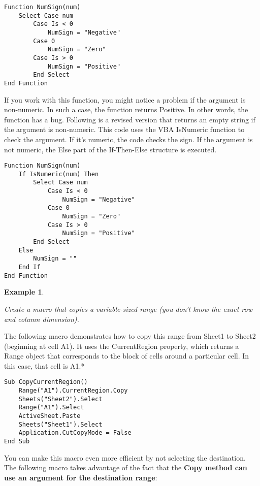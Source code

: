 \documentclass[
]{article}
\theoremstyle{definition}
\theoremstyle{definition}
\newtheorem{example}{Example}[section]
\theoremstyle{definition}
\theoremstyle{definition}
\theoremstyle{remark}
\begin{document}
\begin{verbatim}
Function NumSign(num)
    Select Case num
        Case Is < 0
            NumSign = "Negative"
        Case 0
            NumSign = "Zero"
        Case Is > 0
            NumSign = "Positive"
        End Select
End Function
\end{verbatim}

If you work with this function, you might notice a problem if the argument is non-numeric. In such a case, the function returns Positive. In other words, the function has a bug. Following is a revised version that returns an empty string if the argument is non-numeric. This code uses the VBA IsNumeric function to check the argument. If it's numeric,
the code checks the sign. If the argument is not numeric, the Else part
of the If-Then-Else structure is executed.

\begin{verbatim}
Function NumSign(num)
    If IsNumeric(num) Then
        Select Case num
            Case Is < 0
                NumSign = "Negative"
            Case 0
                NumSign = "Zero"
            Case Is > 0
                NumSign = "Positive"
        End Select
    Else
        NumSign = ""
    End If
End Function
\end{verbatim}

\begin{example}
\protect\hypertarget{exm:unlabeled-div-28}{}\label{exm:unlabeled-div-28}

\emph{Create a macro that copies a variable-sized range (you
don't know the exact row and column dimension).}

\end{example}

The following macro demonstrates how to copy this range from Sheet1 to Sheet2 (beginning at cell A1). It uses the CurrentRegion property,
which returns a Range object that corresponds to the block of cells around a particular cell. In this case, that cell is A1.*

\begin{verbatim}
Sub CopyCurrentRegion()
    Range("A1").CurrentRegion.Copy
    Sheets("Sheet2").Select
    Range("A1").Select
    ActiveSheet.Paste
    Sheets("Sheet1").Select
    Application.CutCopyMode = False
End Sub
\end{verbatim}

You can make this macro even more efficient by not selecting the
destination. The following macro takes advantage of the fact that the
\textbf{Copy method can use an argument for the destination range}:
\end{document}
